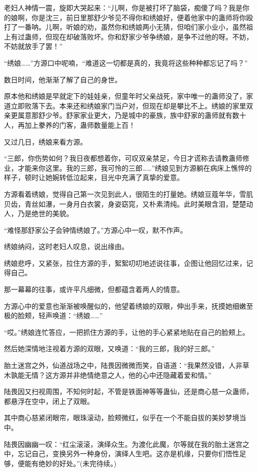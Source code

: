 \begin{this_body}
老妇人神情一震，旋即大哭起来：“儿啊，你是被打坏了脑袋，痴傻了吗？我是你的娘啊，你是沈三，前日里那舒少爷见不得你和绣娘好，便着他家中的蛊师将你殴打了一番呐。儿啊，听娘的劝，虽然你和绣娘两小无猜，但咱们家小业小，虽然祖上有过蛊师，但现在却破落败坏。你和舒家少爷争绣娘，是争不过他的呀。不妨，不妨就放手了罢！”

“绣娘……”方源口中呢喃，“难道这一切都是真的，我竟将这些种种都忘记了吗？”

数日时间，他渐渐了解了自己的身世。

原本他和绣娘是早就定下的娃娃亲，但童年时父亲战死，家中唯一的蛊师没了，家道立即败落下去。本来还和绣娘家门当户对，但现在却是攀比不上。绣娘的家里双亲更属意那舒少爷。舒家家业更大，乃是城中的豪族，族中舒家的蛊师就有数十人，再加上豢养的门客，蛊师数量能上百！

又过几日，绣娘来看方源。

“三郎，你伤势如何？我日夜都想着你，可叹双亲禁足，今日才谎称去请教蛊师修业，才能来你这里。我的三郎，我可怜的三郎……”绣娘见到方源躺在病床上憔悴的样子，顿时让她婉转低泣起来，目光中充满了真挚的爱意。

方源看着绣娘，觉得自己第一次见到此人，很陌生的打量她。绣娘豆蔻年华，雪肌贝齿，青丝如瀑，一身月白衣裳，身姿窈窕，又朴素清纯。此时美眼含泪，楚楚动人，乃是绝世的美貌。

“难怪那舒家公子会钟情绣娘了。”方源心中一叹，默不作声。

绣娘纳闷，这时老妇人叹息，说出缘由。

绣娘悲呼，又紧张，拉住方源的手，絮絮叨叨地述说往事，企图让他回忆过来，记得自己。

那一幕幕的往事，或许平凡细微，但都蕴含着两人的情意。

方源心中的爱意也渐渐被唤醒似的，他望着绣娘的双眼，伸出手来，抚摸她细嫩至极的脸颊，轻声唤道：“绣娘……”

“哎。”绣娘连忙答应，一把抓住方源的手，让他的手心紧紧地贴在自己的脸颊上。

然后她深情地注视着方源的双眼，又唤道：“我的三郎，我的好三郎。”

胎土迷宫之外，仙道战场之中，陆畏因微微而笑，自语道：“我果然没错，人非草木孰能无情？这方源并非绝情绝意之人，他的心中还隐藏着爱和情。”

陆畏因又扫视周围，不知何时起，不管是铁面神等等蛊仙，还是商心慈一众蛊师，都悬浮在空中，闭上了双眼。

其中商心慈紧闭眼帘，眼珠滚动，脸颊微红，似乎在一个不能自拔的美妙梦境当中。

陆畏因幽幽一叹：“红尘滚滚，演绎众生。为渡化此魔，尔等就在我的胎土迷宫之中，忘记自己，变换另外一种身份，演绎人生吧。这亦是机缘，只要你们悟性足够，便能有绝妙的好处。”(未完待续。)

\end{this_body}

